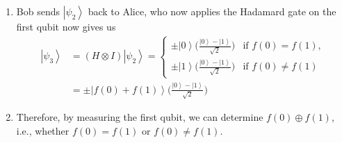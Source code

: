 \documentclass{article}
\newcommand{\ket}[1]{\ensuremath{\left|#1\right\rangle}}
\newcounter{theorem}[section]
\begin{document}
\begin{theorem}
\begin{enumerate}
\begin{align}
            & = \frac{(-1)^{f(x)} \ket{x} \big( \ket{0} - \ket{1} \big)}{\sqrt{2}}
          \end{align}
          Therefore, for $\ket{x} = \ket{\Phi^+}$, we have 
          \begin{align} 
            \ket{\psi_2} = U_f \ket{\psi_1} & = U_f \bigg( \frac{\ket{0} + \ket{1}}{\sqrt{2}} \otimes \frac{\ket{0} - \ket{1}}{\sqrt{2}} \bigg) \\
                             & = \frac{1}{\sqrt{2}} U_f \bigg( \ket{0} \otimes \frac{\ket{0} - \ket{1}}{\sqrt{2}} \bigg) + \frac{1}{\sqrt{2}} U_f \bigg( \ket{1} \otimes \frac{\ket{0} - \ket{1}}{\sqrt{2}} \bigg) \\ 
                             & = \frac{(-1)^{f(0)} \ket{0} ( \ket{0} - \ket{1})}{\sqrt{2} \cdot \sqrt{2}} + \frac{(-1)^{f(1)} \ket{1} ( \ket{0} - \ket{1})}{\sqrt{2} \cdot \sqrt{2}} \\  
                             & = \begin{cases} 
                               \pm \bigg( \frac{\ket{0} + \ket{1}}{\sqrt{2}} \bigg) \bigg( \frac{\ket{0} - \ket{1}}{\sqrt{2}} \bigg) & \text{if } f(0) = f(1), \\
                               \pm \bigg( \frac{\ket{0} - \ket{1}}{\sqrt{2}} \bigg) \bigg( \frac{\ket{0} - \ket{1}}{\sqrt{2}} \bigg) & \text{if } f(0) \neq f(1)
                             \end{cases}
          \end{align}
        \item Bob sends $\ket{\psi_2}$ back to Alice, who now applies the Hadamard gate on the first qubit now gives us 
          \begin{align} 
            \ket{\psi_3} & = (H \otimes I) \ket{\psi_2} = \begin{cases} 
              \pm \ket{0} \bigg( \frac{\ket{0} - \ket{1}}{\sqrt{2}} \bigg) & \text{if } f(0) = f(1), \\ 
              \pm \ket{1} \bigg( \frac{\ket{0} - \ket{1}}{\sqrt{2}} \bigg) & \text{if } f(0) \neq f(1)
            \end{cases} \\
                         & = \pm \ket{f(0) + f(1)} \bigg( \frac{\ket{0} - \ket{1}}{\sqrt{2}} \bigg) 
          \end{align}
        \item Therefore, by measuring the first qubit, we can determine $f(0) \oplus f(1)$, i.e., whether $f(0) = f(1)$ or $f(0) \neq f(1)$. 
      \end{enumerate}
    \end{theorem}
\end{document}

